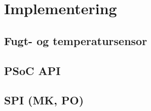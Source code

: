\chapter{Implementering}


\section{Fugt- og temperatursensor}


\section{PSoC API}


\section{SPI (MK, PO)}




